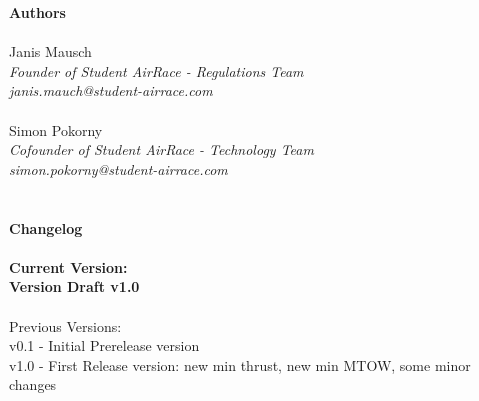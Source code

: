 \documentclass{article}
\newcommand*{\getVersion}{v1.0}
\begin{document}
\tableofcontents{}

\newpage
{\bf Authors}
\\ \\Janis Mausch \emph{\\Founder of Student AirRace - Regulations Team \\janis.mauch@student-airrace.com}
\\ \\ Simon Pokorny \emph{\\Cofounder of Student AirRace - Technology Team \\simon.pokorny@student-airrace.com}
\\ \\ \\
{\bf Changelog}
\\ \\{\bf Current Version: \\Version Draft \getVersion{}}
\\ \\Previous Versions: 
\\ v0.1 - Initial Prerelease version
\\ v1.0 - First Release version: new min thrust, new min MTOW, some minor changes
\end{document}
